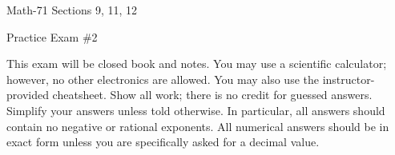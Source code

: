 \documentclass[letterpaper,12pt,fleqn]{article}
\begin{document}
\begin{center}
  \large
  Math-71 Sections 9, 11, 12

  \Large
  Practice Exam \#2
\end{center}

\vspace{0.5in}

This exam will be closed book and notes. You may use a scientific calculator; however, no other electronics are allowed.  You
may also use the instructor-provided cheatsheet.  Show all work; there is no credit for guessed answers.  Simplify your answers
unless told otherwise.  In particular, all answers should contain no negative or rational exponents.  All numerical answers
should be in exact form unless you are specifically asked for a decimal value.

\vspace{0.5in}
\end{document}
